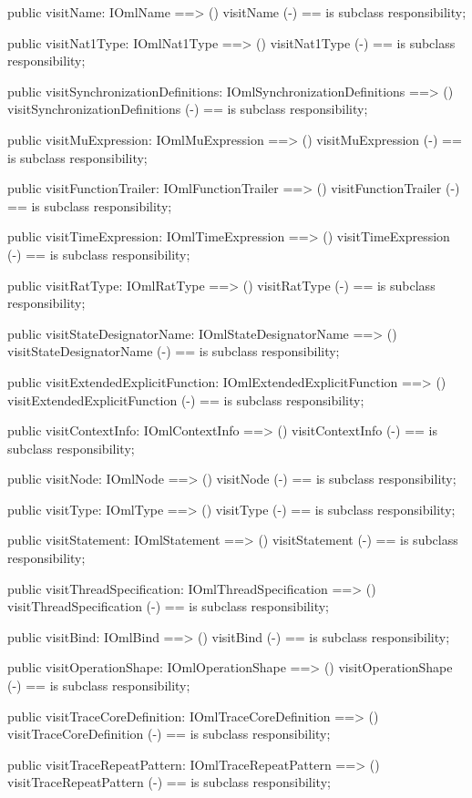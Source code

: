 \begin{vdm_al}
  public visitName: IOmlName ==> ()
  visitName (-) == is subclass responsibility;

  public visitNat1Type: IOmlNat1Type ==> ()
  visitNat1Type (-) == is subclass responsibility;

  public visitSynchronizationDefinitions: IOmlSynchronizationDefinitions ==> ()
  visitSynchronizationDefinitions (-) == is subclass responsibility;

  public visitMuExpression: IOmlMuExpression ==> ()
  visitMuExpression (-) == is subclass responsibility;

  public visitFunctionTrailer: IOmlFunctionTrailer ==> ()
  visitFunctionTrailer (-) == is subclass responsibility;

  public visitTimeExpression: IOmlTimeExpression ==> ()
  visitTimeExpression (-) == is subclass responsibility;

  public visitRatType: IOmlRatType ==> ()
  visitRatType (-) == is subclass responsibility;

  public visitStateDesignatorName: IOmlStateDesignatorName ==> ()
  visitStateDesignatorName (-) == is subclass responsibility;

  public visitExtendedExplicitFunction: IOmlExtendedExplicitFunction ==> ()
  visitExtendedExplicitFunction (-) == is subclass responsibility;

  public visitContextInfo: IOmlContextInfo ==> ()
  visitContextInfo (-) == is subclass responsibility;

  public visitNode: IOmlNode ==> ()
  visitNode (-) == is subclass responsibility;

  public visitType: IOmlType ==> ()
  visitType (-) == is subclass responsibility;

  public visitStatement: IOmlStatement ==> ()
  visitStatement (-) == is subclass responsibility;

  public visitThreadSpecification: IOmlThreadSpecification ==> ()
  visitThreadSpecification (-) == is subclass responsibility;

  public visitBind: IOmlBind ==> ()
  visitBind (-) == is subclass responsibility;

  public visitOperationShape: IOmlOperationShape ==> ()
  visitOperationShape (-) == is subclass responsibility;

  public visitTraceCoreDefinition: IOmlTraceCoreDefinition ==> ()
  visitTraceCoreDefinition (-) == is subclass responsibility;

  public visitTraceRepeatPattern: IOmlTraceRepeatPattern ==> ()
  visitTraceRepeatPattern (-) == is subclass responsibility;


\end{vdm_al}
